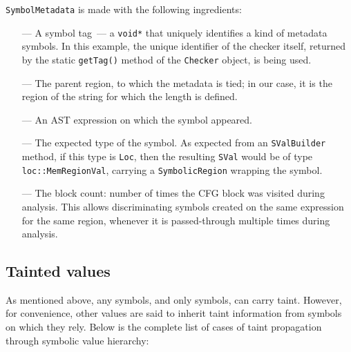 \documentclass[a4paper,12pt]{article}
\begin{document}
\lstinline|SymbolMetadata| is made with the following ingredients:
\begin{itemize}
\item[---]A symbol tag~--- a \lstinline|void*| that uniquely identifies a kind of metadata symbols. In this example, the unique identifier of the checker itself, returned by the static \lstinline|getTag()| method of the \lstinline|Checker| object, is being used.
\item[---]The parent region, to which the metadata is tied; in our case, it is the region of the string for which the length is defined.
\item[---]An AST expression on which the symbol appeared.
\item[---]The expected type of the symbol. As expected from an \lstinline|SValBuilder| method, if this type is \lstinline|Loc|, then the resulting \lstinline|SVal| would be of type \lstinline|loc::MemRegionVal|, carrying a \lstinline|SymbolicRegion| wrapping the symbol.
\item[---]The block count: number of times the CFG block was visited during analysis. This allows discriminating symbols created on the same expression for the same region, whenever it is passed-through multiple times during analysis.
\end{itemize}

\subsection{Tainted values}\label{subsec:taint_3}

As mentioned above, any symbols, and only symbols, can carry taint. However, for convenience, other values are said to inherit taint information from symbols on which they rely. Below is the complete list of cases of taint propagation through symbolic value hierarchy:
\end{document}
